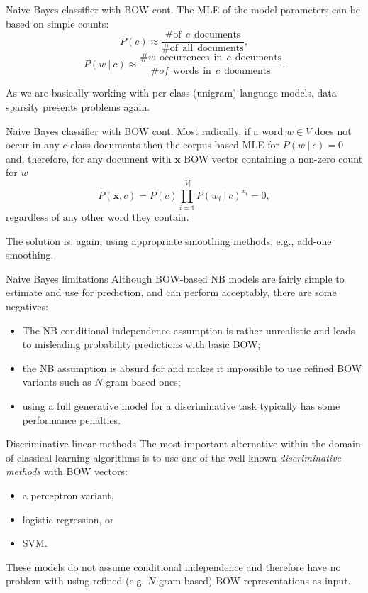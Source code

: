 \documentclass[style=upen, size=14pt]{powerdot}
\theoremstyle{definition}
\begin{document}
 \begin{slide}[toc=]{Naive Bayes classifier with BOW cont.}
   The MLE of the model parameters can be based on simple counts:
   $$
   P(c) \approx \frac{\# \mathrm{of}~~c~~\mathrm{documents}}{ \# \mathrm{of~~all~~documents}},
   $$
   $$
   P(w~|~c) \approx \frac{\# w~~\mathrm{occurrences~~in}~~c~~\mathrm{documents}}{\# of~~\mathrm{words~~in}~~c~~\mathrm{documents}}.
   $$\smallskip
   
   As we are basically working with per-class (unigram) language models, data
   sparsity presents problems again.
 \end{slide}

 \begin{slide}[toc=]{Naive Bayes classifier with BOW cont.}
   Most radically, if a word $w\in V$ does not occur in any $c$-class documents
   then the corpus-based MLE for $P(w~|~c)=0$ and, therefore, for any document
   with $\mathbf{x}$ BOW vector containing a non-zero count for  $w$
   $$
   P(\mathbf{x}, c) = P(c) \prod_{i=1}^{|V|}P(w_i~\vert~c)^{x_i}=0,
   $$
   regardless of any other word they contain.

   The solution is, again, using appropriate smoothing methods, e.g., add-one
   smoothing.
 \end{slide}

 \begin{slide}[toc=]{Naive Bayes limitations}
   Although BOW-based NB models are fairly simple to estimate and use for
   prediction, and can perform acceptably, there are some negatives:
   \begin{itemize}
   \item The NB conditional independence assumption is rather unrealistic and
     leads to misleading probability predictions with basic BOW;
   \item the NB assumption is absurd for and makes it impossible to use refined
     BOW variants such as $N$-gram based ones;
   \item using a full generative model for a discriminative task typically has
     some performance penalties.
   \end{itemize}
 \end{slide}

 \begin{slide}[toc=Discriminative methods]{Discriminative linear methods}
   The most important alternative within the domain of classical learning
   algorithms is to use one of the well known \emph{discriminative methods} with
   BOW vectors:
   \begin{itemize}
   \item a perceptron variant,
   \item logistic regression, or  
   \item SVM.
   \end{itemize}
   These models do not assume conditional independence and therefore have no
   problem with using refined (e.g. $N$-gram based) BOW representations as input.
 \end{slide}
\end{document}
